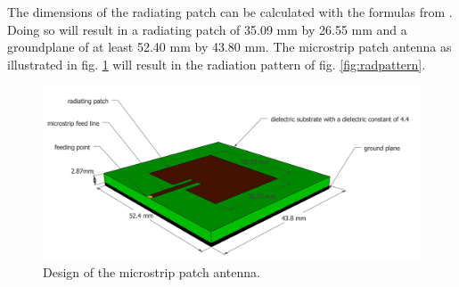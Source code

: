 \documentclass[twocolumn]{phdsymp} %
\begin{document}
The dimensions of the radiating patch can be calculated with the formulas from \cite{J14_antennadesign,J15_antennadesign}.
Doing so will result in a radiating patch of 35.09 mm by 26.55 mm and a groundplane of at least 52.40 mm by 43.80 mm.
The microstrip patch antenna as illustrated in fig. \ref{fig:basicpatchantenna} will result in the radiation pattern of fig. \ref{fig:radpattern}.
\begin{figure}[h!]
\centering
  \includegraphics[width=\linewidth]{MicrostripAntenna.png}
  \caption{Design of the microstrip patch antenna.}
  \label{fig:basicpatchantenna}
\end{figure}
\end{document}
